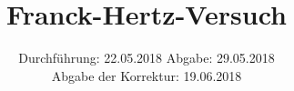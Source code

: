 

\subject{Versuch 601}
\title{Franck-Hertz-Versuch}
\date{
  Durchführung: 22.05.2018
  \hspace{3em}
  Abgabe: 29.05.2018\\
  Abgabe der Korrektur: 19.06.2018
}


      \maketitle
      \thispagestyle{empty}
      \tableofcontents
      \newpage
      
      
      
      \newpage
      
      
      \printbibliography{}
      

